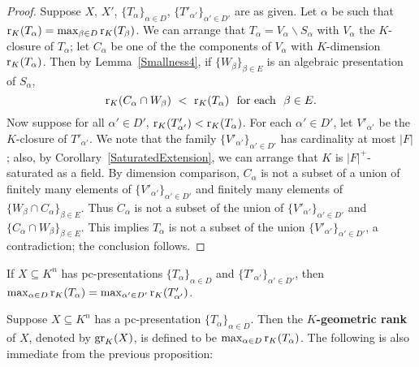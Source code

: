 \begin{proof}
Suppose $X$, $X'$, $\{ T_\alpha\}_{ \alpha \in D}$, $\{ T'_{\alpha'}\}_{ \alpha' \in D'}$ are as given. Let $\alpha$ be such that $\mathrm{r}_K(T_{\alpha}) =\max_{\beta \in D}\mathrm{r}_K(T_\beta) $. We can arrange that $T_\alpha = V_\alpha \backslash S_\alpha$ with $V_\alpha$ the $K$-closure of $T_\alpha$; let $C_\alpha$ be one of the the components of $V_\alpha$ with $K$-dimension $\mathrm{r}_K(T_\alpha)$. Then by Lemma~\ref{Smallness4}, if $\{W_\beta\}_{\beta \in E}$ is an algebraic presentation of $S_\alpha$, 
$$\mr_K(C_\alpha \cap W_\beta)\ <\ \mr_K(T_\alpha)\ \text{ for each }\ \beta \in E.$$
Now suppose for all $\alpha' \in D'$, $\mathrm{r}_K( T'_{\alpha'})< \mathrm{r}_K(T_\alpha)$. For each $\alpha' \in D'$, let $V'_{\alpha'}$ be the $K$-closure of $T'_{\alpha'}$. We note that the family $\{ V'_{\alpha'}\}_{ \alpha' \in D'}$ has cardinality at most $|F|$; also, by Corollary~\ref{SaturatedExtension}, we can arrange that $K$ is $|F|^+$-saturated as a field. By dimension comparison, $C_\alpha$ is not a subset of a union of finitely many elements of $\{ V'_{\alpha'}\}_{ \alpha' \in D'}$ and finitely many elements of $\{W_\beta \cap C_\alpha\}_{\beta \in E}$. Thus $C_\alpha$ is not a subset of the union of $\{ V'_{\alpha'}\}_{ \alpha' \in D'}$ and $\{C_\alpha \cap W_\beta\}_{\beta \in E}$. This implies $T_\alpha$ is not a subset of the union $\{ V'_{\alpha'}\}_{ \alpha' \in D'}$, a contradiction; the conclusion follows.
\begin{comment}
There is some $c \in K^l$ such that the family $\{ T'_{\alpha'}\}_{ \alpha' \in D'}$ is definable over $c$. Hence, for each $\alpha' \in D'$, $T'_{\alpha'}$ is definable over $c,\chi(F)$; by lemma~\ref{DefClosure1}, for each $\alpha' \in D'$, $V'_{\alpha'}$ is definable over $\qq(c, \chi(F))$ in the field sense; 
\end{comment}
\end{proof}

\begin{cor}
If $X \subseteq K^n$ has pc-presentations $\{ T_\alpha\}_{ \alpha \in D}$ and $\{ T'_{\alpha'}\}_{ \alpha' \in D'}$, then $\max_{\alpha \in D} \mathrm{r}_K(T_\alpha) = \max_{\alpha' \in D'} \mathrm{r}_K(T'_{\alpha'}) $.
\end{cor}

\noindent
Suppose $X\subseteq K^n$ has  a pc-presentation $\{ T_\alpha\}_{ \alpha \in D}$. Then the {\bf $K$-geometric rank} of $X$, denoted by $ \mathrm{gr}_K(X)$, is defined to be  $\max_{\alpha \in D} \mathrm{r}_K(T_\alpha)$. The following is also immediate from the previous proposition:

